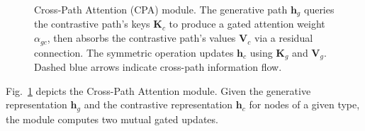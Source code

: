 \documentclass[conference]{IEEEtran}
\begin{document}
\begin{figure}[t]
\caption{Cross-Path Attention (CPA) module. The generative path
  $\mathbf{h}_g$ queries the contrastive path's keys $\mathbf{K}_c$
  to produce a gated attention weight $\alpha_{gc}$, then absorbs the
  contrastive path's values $\mathbf{V}_c$ via a residual connection.
  The symmetric operation updates $\mathbf{h}_c$ using
  $\mathbf{K}_g$ and $\mathbf{V}_g$.
  Dashed blue arrows indicate cross-path information flow.}
\label{fig:cpa}
\end{figure}

Fig.~\ref{fig:cpa} depicts the Cross-Path Attention module.
Given the generative representation $\mathbf{h}_g$ and the contrastive
representation $\mathbf{h}_c$ for nodes of a given type, the module
computes two mutual gated updates.
\end{document}
